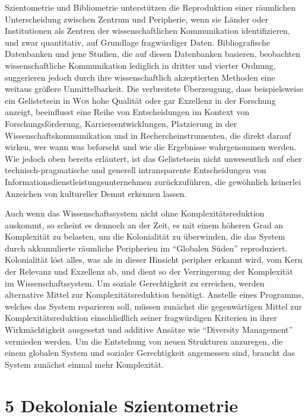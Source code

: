 \documentclass[a4paper,
fontsize=11pt,
oneside,
numbers=noperiodatend,
parskip=half-,
bibliography=totoc,
final
]{scrartcl}
\begin{document}
Szientometrie und Bibliometrie unterstützen die Reproduktion einer
räumlichen Unterscheidung zwischen Zentrum und Peripherie, wenn sie
Länder oder Institutionen als Zentren der wissenschaftlichen
Kommunikation identifizieren, und zwar quantitativ, auf Grundlage
fragwürdiger Daten. Bibliografische Datenbanken und jene Studien, die
auf diesen Datenbanken basieren, beobachten wissenschaftliche
Kommunikation lediglich in dritter und vierter Ordnung, suggerieren
jedoch durch ihre wissenschaftlich akzeptierten Methoden eine weitaus
größere Unmittelbarkeit. Die verbreitete Überzeugung, dass
beispielsweise ein Gelistetsein in \textsc{Wos} hohe Qualität oder gar
Exzellenz in der Forschung anzeigt, beeinflusst eine Reihe von
Entscheidungen im Kontext von Forschungsförderung,
Karriereentwicklungen, Platzierung in der Wissenschaftskommunikation und
in Rechercheinstrumenten, die direkt darauf wirken, wer wann was
beforscht und wie die Ergebnisse wahrgenommen werden. Wie jedoch oben
bereits erläutert, ist das Gelistetsein nicht unwesentlich auf eher
technisch-pragmatische und generell intransparente Entscheidungen von
Informationsdienstleistungsunternehmen zurückzuführen, die gewöhnlich
keinerlei Anzeichen von kultureller Demut erkennen lassen.

Auch wenn das Wissenschaftssystem nicht ohne Komplexitätsreduktion
auskommt, so scheint es dennoch an der Zeit, es mit einem höheren Grad
an Komplexität zu belasten, um die Kolonialität zu überwinden, die das
System durch akkumulierte räumliche Peripherien im \enquote{Globalen
Süden} reproduziert. Kolonialität löst alles, was als in dieser Hinsicht
peripher erkannt wird, vom Kern der Relevanz und Exzellenz ab, und dient
so der Verringerung der Komplexität im Wissenschaftssystem. Um soziale
Gerechtigkeit zu erreichen, werden alternative Mittel zur
Komplexitätsreduktion benötigt. Anstelle eines Programms, welches das
System reparieren soll, müssen zunächst die gegenwärtigen Mittel zur
Komplexitätsreduktion einschließlich seiner fragwürdigen Kriterien in
ihrer Wirkmächtigkeit ausgesetzt und additive Ansätze wie
\enquote{Diversity Management} vermieden werden. Um die Entstehung von
neuen Strukturen anzuregen, die einem globalen System und sozialer
Gerechtigkeit angemessen sind, braucht das System zunächst einmal mehr
Komplexität.

\hypertarget{sziento}{%
\section{5 Dekoloniale Szientometrie}\label{sziento}}
\end{document}
